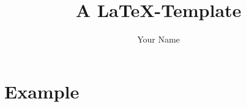 \documentclass{article}
\title{A \LaTeX-Template} %
\author{Your Name} %
\begin{document}
    \maketitle
    \hypersetup{hidelinks}
    \tableofcontents
    \newpage


    \section{Example}\label{sec:example}
    
\end{document}
